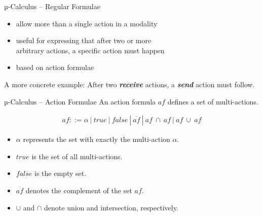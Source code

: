 \documentclass[aspectratio=1610]{beamer}
\begin{document}
  \begin{frame}{µ-Calculus – Regular Formulae}
    \begin{itemize}
      \item allow more than a single action in a modality
      \item useful for expressing that after two or more \\
            arbitrary actions, a specific action must happen
      \item based on action formulae
    \end{itemize}

    \begin{exampleblock}{A more concrete example:}
      After two \textit{\textbf{receive}} actions, a \textit{\textbf{send}} action must follow.
    \end{exampleblock}
  \end{frame}

  \begin{frame}{µ-Calculus – Action Formulae}
    An action formula $\mathit{af}$ defines a set of multi-actions.

    \begin{align*}
      \mathit{af} ::= \alpha\ |\ \mathit{true}\ |\ \mathit{false}\ |\ \overline{\mathit{af}}\ |\ \mathit{af}\ \cap\ \mathit{af}\ |\ \mathit{af}\ \cup\ \mathit{af}
    \end{align*}

    \begin{itemize}
      \item $\alpha$ represents the set with exactly the multi-action $\alpha$.
      \item $\mathit{true}$ is the set of all multi-actions.
      \item $\mathit{false}$ is the empty set.
      \item $\overline{\mathit{af}}$ denotes the complement of the set $\mathit{af}$.
      \item $\cup$ and $\cap$ denote union and intersection, respectively.
    \end{itemize}
  \end{frame}
\end{document}
